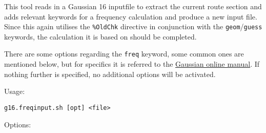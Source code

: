 \documentclass[   %
  final,          %
  a4paper         %
]{article}
\begin{document}
This tool reads in a Gaussian 16 inputfile to extract the current route section
and adds relevant keywords for a frequency calculation and produce a new input file.
Since this again utilises the \texttt{\%OldChk} directive in conjunction with 
the \texttt{geom}/\texttt{guess} keywords, the calculation it is based on should be completed.

There are some options regarding the \texttt{freq} keyword, some common ones are mentioned below,
but for specifics it is referred to the \href{http://gaussian.com/freq/}{Gaussian online manual}.
If nothing further is specified, no additional options will be activated.

Usage: 

\lstinline`g16.freqinput.sh [opt] <file>`

Options:
\end{document}
